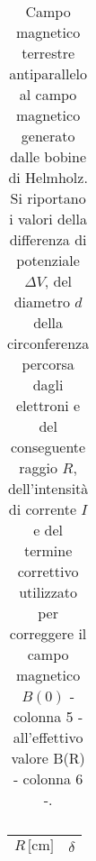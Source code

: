 \documentclass[]{article}
\begin{document}
\begin{table}
\begin{tabular}{||c|c|c|c|c|c|c||}
\end{tabular}
    \caption{Campo magnetico terrestre antiparallelo al campo magnetico generato dalle bobine di Helmholz. Si riportano i valori della differenza di potenziale $\Delta V$, del diametro $ d $ della circonferenza percorsa dagli elettroni e del conseguente raggio $ R $, dell'intensità di corrente $ I $ e del termine correttivo utilizzato per correggere il campo magnetico $B(0)$ - colonna 5 - all'effettivo valore B(R) - colonna 6 -.}
    \label{CM_antiparallelo}
\end{table}


\begin{table}
    \centering

\begin{tabular}{||c|c||}
    \hline
    $R \, \text{[cm]} $ & $ \delta $\\
    \hline\hline




\end{tabular}
\end{table}
\end{document}
